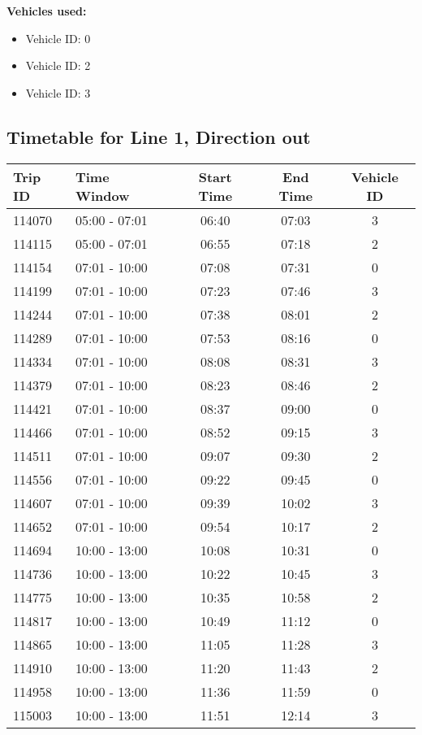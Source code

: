 \documentclass{article}
\begin{document}
\textbf{Vehicles used:}
\begin{itemize}
  \item Vehicle ID: 0
  \item Vehicle ID: 2
  \item Vehicle ID: 3
\end{itemize}

\subsection*{Timetable for Line 1, Direction out}
\begin{tabular}{llccc}
\toprule
Trip ID & Time Window & Start Time & End Time & Vehicle ID \\
\midrule
114070 & 05:00 - 07:01 & 06:40 & 07:03 & 3 \\
114115 & 05:00 - 07:01 & 06:55 & 07:18 & 2 \\
114154 & 07:01 - 10:00 & 07:08 & 07:31 & 0 \\
114199 & 07:01 - 10:00 & 07:23 & 07:46 & 3 \\
114244 & 07:01 - 10:00 & 07:38 & 08:01 & 2 \\
114289 & 07:01 - 10:00 & 07:53 & 08:16 & 0 \\
114334 & 07:01 - 10:00 & 08:08 & 08:31 & 3 \\
114379 & 07:01 - 10:00 & 08:23 & 08:46 & 2 \\
114421 & 07:01 - 10:00 & 08:37 & 09:00 & 0 \\
114466 & 07:01 - 10:00 & 08:52 & 09:15 & 3 \\
114511 & 07:01 - 10:00 & 09:07 & 09:30 & 2 \\
114556 & 07:01 - 10:00 & 09:22 & 09:45 & 0 \\
114607 & 07:01 - 10:00 & 09:39 & 10:02 & 3 \\
114652 & 07:01 - 10:00 & 09:54 & 10:17 & 2 \\
114694 & 10:00 - 13:00 & 10:08 & 10:31 & 0 \\
114736 & 10:00 - 13:00 & 10:22 & 10:45 & 3 \\
114775 & 10:00 - 13:00 & 10:35 & 10:58 & 2 \\
114817 & 10:00 - 13:00 & 10:49 & 11:12 & 0 \\
114865 & 10:00 - 13:00 & 11:05 & 11:28 & 3 \\
114910 & 10:00 - 13:00 & 11:20 & 11:43 & 2 \\
114958 & 10:00 - 13:00 & 11:36 & 11:59 & 0 \\
115003 & 10:00 - 13:00 & 11:51 & 12:14 & 3 \\

\end{tabular}
\end{document}

